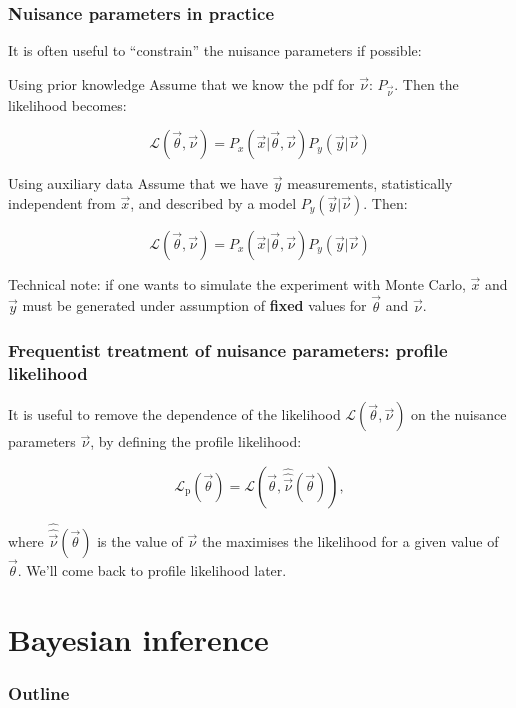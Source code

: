 \documentclass[9pt]{beamer}
\begin{document}
\begin{frame}
 \frametitle{Nuisance parameters in practice}
 
 It is often useful to ``constrain'' the nuisance parameters if possible:
 
 
 \begin{block}{Using prior knowledge}
  Assume that we know the pdf for $\vec{\nu}$: $P_{\vec{\nu}}$. Then the likelihood becomes:
  
 $$\mathcal{L}(\vec{\theta},\vec{\nu}) = P_x(\vec{x}|\vec{\theta},\vec{\nu}) P_y(\vec{y}|\vec{\nu})$$ 
 \end{block}
 
 \begin{block}{Using auxiliary data}
 Assume that we have $\vec{y}$ measurements, statistically independent from $\vec{x}$, and described by a model $P_y(\vec{y}|\vec{\nu})$. Then:
 
  $$\mathcal{L}(\vec{\theta},\vec{\nu}) = P_x(\vec{x}|\vec{\theta},\vec{\nu}) P_y(\vec{y}|\vec{\nu})$$
 \end{block}

 Technical note: if one wants to simulate the experiment with Monte Carlo, $\vec{x}$ and $\vec{y}$ must be generated under assumption of \textbf{fixed} values for $\vec{\theta}$ and $\vec{\nu}$.
\end{frame}

\begin{frame}
 \frametitle{Frequentist treatment of nuisance parameters: profile likelihood}
 
 It is useful to remove the dependence of the likelihood $\mathcal{L}(\vec{\theta},\vec{\nu})$ on the nuisance parameters $\vec{\nu}$, by defining the profile likelihood:
 
 $$\mathcal{L}_\text{p}(\vec{\theta}) = \mathcal{L}(\vec{\theta},\hat{\hat{\vec{\nu}}}(\vec{\theta})),$$
 
 where $\hat{\hat{\vec{\nu}}}(\vec{\theta})$ is the value of $\vec{\nu}$
 the maximises the likelihood for a given value of $\vec{\theta}$. We'll come back to profile likelihood later.
\end{frame}

\section{Bayesian inference}

\begin{frame}
 \frametitle{Outline}
 
 \tableofcontents[current]
\end{frame}
\end{document}
